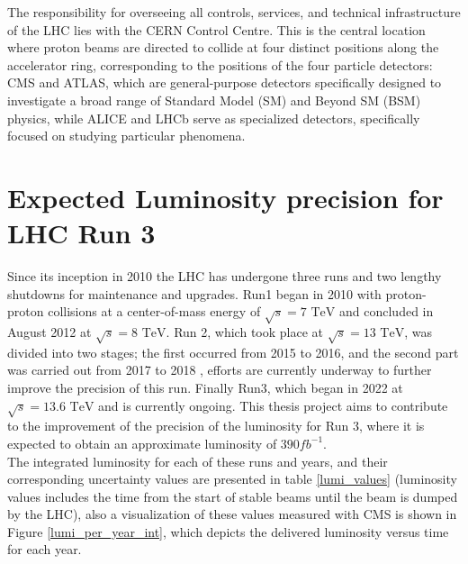 The responsibility for overseeing all controls, services, and technical infrastructure of the LHC lies with the CERN Control Centre. This is the central location where proton beams are directed to collide at four distinct positions along the accelerator ring, corresponding to the positions of the four particle detectors: CMS and ATLAS, which are general-purpose detectors specifically designed to investigate a broad range of Standard Model (SM) and Beyond SM (BSM) physics, while ALICE and LHCb serve as specialized detectors, specifically focused on studying particular phenomena.


\section{Expected  Luminosity precision for LHC Run 3}

Since its inception in 2010 the LHC has undergone three runs and two lengthy shutdowns for maintenance and upgrades. 
Run1 began in 2010 with proton-proton collisions at a center-of-mass energy of $\sqrt{s}=\text{7 TeV}$ and concluded in August 2012 at  $\sqrt{s}=\text{8 TeV}$\cite{LHC_status_2013}. Run 2, which took place at $\sqrt{s}=\text{13 TeV}$, was divided into two stages; the first  occurred from 2015 to 2016, and the second part  was carried out   from 2017 to 2018 \cite{pas_17,pas_18}, efforts are currently underway to further improve the precision of this run. Finally  Run3, which began in 2022 at $\sqrt{s}=\text{13.6 TeV}$ and is currently ongoing. This thesis project aims to contribute to the improvement of the precision of the luminosity for Run 3, where it is expected to obtain an approximate luminosity of $390 fb^{-1}$. \\

The integrated luminosity for each of these runs and years, and their corresponding uncertainty values are presented in table \ref{lumi_values} (luminosity values includes the time from the start of stable beams until the beam is dumped by the LHC), also a visualization of these values measured with CMS is shown in Figure \ref{lumi_per_year_int}, which depicts the delivered luminosity versus time for each year.


